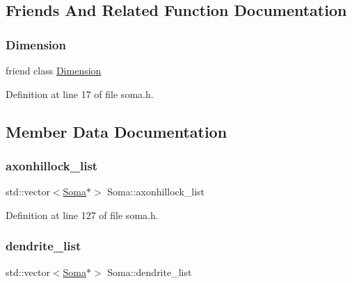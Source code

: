 \subsection{Friends And Related Function Documentation}
\mbox{\label{class_soma_aabae1fdc220bf040d4f5c2c057abfcf5}} 
\subsubsection{\texorpdfstring{Dimension}{Dimension}}
{\footnotesize\ttfamily friend class \mbox{\hyperlink{class_dimension}{Dimension}}\hspace{0.3cm}{\ttfamily [friend]}}



Definition at line 17 of file soma.\+h.



\subsection{Member Data Documentation}
\mbox{\label{class_soma_af93902336cddb974b282aef8b7b4243c}} 
\subsubsection{\texorpdfstring{axonhillock\+\_\+list}{axonhillock\_list}}
{\footnotesize\ttfamily std\+::vector$<$\mbox{\hyperlink{class_soma}{Soma}}$\ast$$>$ Soma\+::axonhillock\+\_\+list\hspace{0.3cm}{\ttfamily [protected]}}



Definition at line 127 of file soma.\+h.

\mbox{\label{class_soma_ab2d13b0adf2d10c242df0b8e62bcc01a}} 
\subsubsection{\texorpdfstring{dendrite\+\_\+list}{dendrite\_list}}
{\footnotesize\ttfamily std\+::vector$<$\mbox{\hyperlink{class_soma}{Soma}}$\ast$$>$ Soma\+::dendrite\+\_\+list\hspace{0.3cm}{\ttfamily [protected]}}



